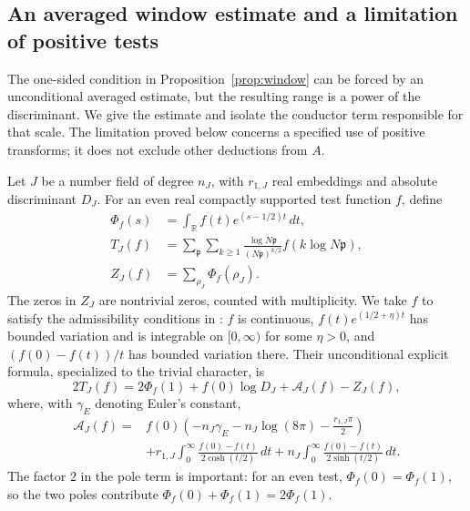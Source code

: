 \documentclass[11pt]{article}
\theoremstyle{definition}
\theoremstyle{remark}
\begin{document}
\subsection{An averaged window estimate and a limitation of positive tests}
\label{sec:positive-window-tests}

The one-sided condition in Proposition~\ref{prop:window} can be
forced by an unconditional averaged estimate, but the resulting range
is a power of the discriminant.  We give the estimate and isolate the
conductor term responsible for that scale.  The limitation proved below
concerns a specified use of positive transforms; it does not exclude
other deductions from $A$.

Let $J$ be a number field of degree $n_J$, with $r_{1,J}$ real
embeddings and absolute discriminant $D_J$.  For an even real compactly
supported test function $f$, define
\begin{align*}
 \Phi_f(s)&=\int_{\mathbb R}f(t)e^{(s-1/2)t}\,dt,\\
 T_J(f)&=\sum_{\mathfrak p}\sum_{k\geq1}
 \frac{\log N\mathfrak p}{(N\mathfrak p)^{k/2}}
 f(k\log N\mathfrak p),\\
 Z_J(f)&=\sum_{\rho_J}\Phi_f(\rho_J).
\end{align*}
The zeros in $Z_J$ are nontrivial zeros, counted with multiplicity.
We take $f$ to satisfy the admissibility conditions in
\citet[author pp.~4--5, equations~(3)--(4)]{BDF2008}:
$f$ is continuous, $f(t)e^{(1/2+\eta)t}$ has bounded variation
and is integrable on $[0,\infty)$ for some $\eta>0$, and
$(f(0)-f(t))/t$ has bounded variation there.  Their unconditional
explicit formula, specialized to the trivial character, is
\begin{equation}\label{eq:positive-test-explicit}
 2T_J(f)=2\Phi_f(1)+f(0)\log D_J+\mathcal A_J(f)-Z_J(f),
\end{equation}
where, with $\gamma_{\!E}$ denoting Euler's constant,
\begin{align*}
 \mathcal A_J(f)={}&
 f(0)\left(-n_J\gamma_{\!E}-n_J\log(8\pi)
                   -\frac{r_{1,J}\pi}{2}\right)\\
 &+r_{1,J}\int_0^\infty
       \frac{f(0)-f(t)}{2\cosh(t/2)}\,dt
  +n_J\int_0^\infty
       \frac{f(0)-f(t)}{2\sinh(t/2)}\,dt .
\end{align*}
The factor $2$ in the pole term is important: for an even test,
$\Phi_f(0)=\Phi_f(1)$, so the two poles contribute
$\Phi_f(0)+\Phi_f(1)=2\Phi_f(1)$.
\end{document}
